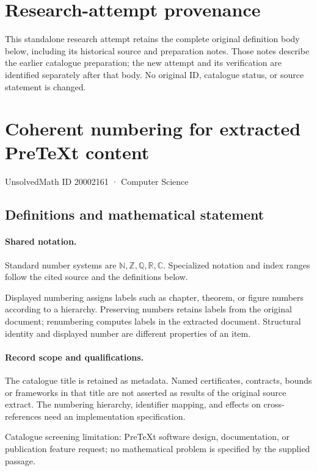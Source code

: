 \documentclass[11pt]{article}
\begin{document}
\section*{Research-attempt provenance}
This standalone research attempt retains the complete original definition body below,
including its historical source and preparation notes. Those notes describe the
earlier catalogue preparation; the new attempt and its verification are identified
separately after that body. No original ID, catalogue status, or source statement is changed.

\section{Coherent numbering for extracted PreTeXt content}\label{20002161}
{\small UnsolvedMath ID 20002161 · Computer Science}
\subsection{Definitions and mathematical statement}

\paragraph{Shared notation.}Standard number systems are $\mathbb N,\mathbb Z,\mathbb Q,\mathbb R,\mathbb C$. Specialized notation and index ranges follow the cited source and the definitions below.


Displayed numbering assigns labels such as chapter, theorem, or figure numbers according to a hierarchy. Preserving numbers retains labels from the original document; renumbering computes labels in the extracted document. Structural identity and displayed number are different properties of an item.
\paragraph{Record scope and qualifications.}
The catalogue title is retained as metadata. Named certificates, contracts, bounds or frameworks in that title are not asserted as results of the original source extract.
The numbering hierarchy, identifier mapping, and effects on cross-references need an implementation specification.

Catalogue screening limitation: PreTeXt software design, documentation, or publication feature request; no mathematical problem is specified by the supplied passage.
\end{document}
